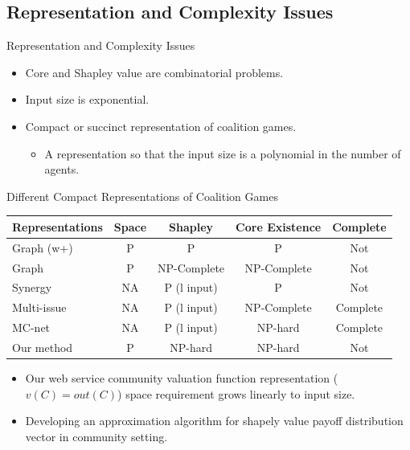 \documentclass{beamer}
\begin{document}
\subsection{Representation and Complexity Issues}
\begin{frame}{Representation and Complexity Issues}
    \begin{itemize}
        \item Core and Shapley value are combinatorial problems.
        \item Input size is exponential.
        \item Compact or succinct representation of coalition games.
        \begin{itemize}
            \item A representation so that the input size is a polynomial in the number of agents.
        \end{itemize}
    \end{itemize}
\end{frame}

\begin{frame}{Different Compact Representations of Coalition Games}

    \begin{table}
        \small
        \begin{tabular}{l|c|c|c|c}
        Representations                  & Space    & Shapley                  & Core Existence  & Complete     \\ \hline
        Graph (w+)                       & P        & P                        & P               & Not          \\
        Graph                            & P        & NP-Complete              & NP-Complete     & Not          \\
        Synergy                          & NA       & P (l input)              & P               & Not          \\
        Multi-issue                      & NA       & P (l input)              & NP-Complete     & Complete     \\
        MC-net                           & NA       & P (l input)              & NP-hard         & Complete     \\
        Our method                       & P        & NP-hard                  & NP-hard         & Not          \\
        \end{tabular}
    \end{table}

    \begin{itemize}
        \item Our web service community valuation function representation ($v(C) = out(C)$) space requirement grows linearly to input size.
        \item Developing an approximation algorithm for shapely value payoff distribution vector in community setting.
    \end{itemize}

\end{frame}
\end{document}
